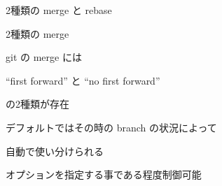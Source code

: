 % 
% 
% 
% 

\begin{frame}{}{}
  2種類の merge と rebase
\end{frame}

\begin{frame}[t]{2種類の merge}{}

  git の merge には

  ``first forward'' と ``no first forward''

  の2種類が存在
  \vspace{4ex}

  デフォルトではその時の branch の状況によって

  自動で使い分けられる
  \vspace{2ex}

  オプションを指定する事である程度制御可能
\end{frame}


